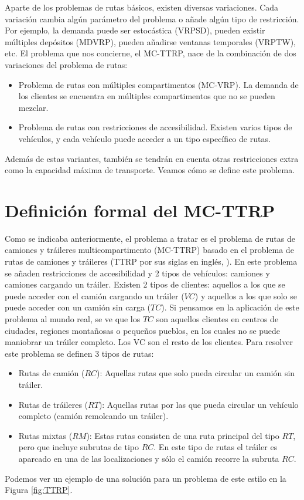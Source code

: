 Aparte de los problemas de rutas básicos, existen diversas variaciones. Cada variación cambia algún parámetro del problema o añade algún tipo de restricción. Por ejemplo, la demanda puede ser estocástica (VRPSD), pueden existir múltiples depósitos (MDVRP), pueden añadirse ventanas temporales (VRPTW), etc. El problema que nos concierne, el MC-TTRP, nace de la combinación de dos variaciones del problema de rutas:
\begin{itemize}
    \item Problema de rutas con múltiples compartimentos (MC-VRP). La demanda de los clientes se encuentra en múltiples compartimentos que no se pueden mezclar.
    \item Problema de rutas con restricciones de accesibilidad. Existen varios tipos de vehículos, y cada vehículo puede acceder a un tipo específico de rutas.
\end{itemize}

Además de estas variantes, también se tendrán en cuenta otras restricciones extra como la capacidad máxima de transporte. Veamos cómo se define este problema.

\section{Definición formal del MC-TTRP}
Como se indicaba anteriormente, el problema a tratar es el problema de rutas de camiones y tráileres multicompartimento (MC-TTRP) basado en el problema de rutas de camiones y tráileres (TTRP por sus siglas en inglés, \cite{chao-ttrp}). En este problema se añaden restricciones de accesibilidad y 2 tipos de vehículos: camiones y camiones cargando un tráiler. Existen 2 tipos de clientes: aquellos a los que se puede acceder con el camión cargando un tráiler ($VC$) y aquellos a los que solo se puede acceder con un camión sin carga ($TC$). Si pensamos en la aplicación de este problema al mundo real, se ve que los $TC$ son aquellos clientes en centros de ciudades, regiones montañosas o pequeños pueblos, en los cuales no se puede maniobrar un tráiler completo. Los VC son el resto de los clientes. Para resolver este problema se definen 3 tipos de rutas:
\begin{itemize}
    \item Rutas de camión ($RC$): Aquellas rutas que solo pueda circular un camión sin tráiler.
    \item Rutas de tráileres ($RT$): Aquellas rutas por las que pueda circular un vehículo completo (camión remolcando un tráiler).
    \item Rutas mixtas ($RM$): Estas rutas consisten de una ruta principal del tipo $RT$, pero que incluye subrutas de tipo $RC$. En este tipo de rutas el tráiler es aparcado en una de las localizaciones y sólo el camión recorre la subruta $RC$.
\end{itemize}
Podemos ver un ejemplo de una solución para un problema de este estilo en la Figura \ref{fig:TTRP}.

